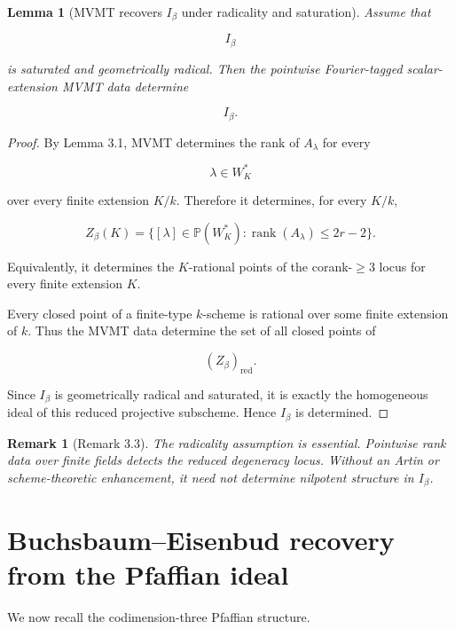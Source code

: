 \documentclass[11pt]{article}
\newtheorem{lemma}[theorem]{Lemma}
\newtheorem{remark}[theorem]{Remark}
\begin{document}
\begin{lemma}[MVMT recovers $I_\beta$ under radicality and saturation]

Assume that

\[
I_\beta
\]

is saturated and geometrically radical. Then the pointwise Fourier-tagged scalar-extension MVMT data determine

\[
I_\beta.
\]

\end{lemma}

\begin{proof}

By Lemma 3.1, MVMT determines the rank of $A_\lambda$ for every

\[
\lambda\in W_K^*
\]

over every finite extension $K/k$. Therefore it determines, for every $K/k$,

\[
Z_\beta(K)
=
\{[\lambda]\in\mathbb P(W_K^*):\operatorname{rank}(A_\lambda)\le2r-2\}.
\]

Equivalently, it determines the $K$-rational points of the corank-$\ge3$ locus for every finite extension $K$.

Every closed point of a finite-type $k$-scheme is rational over some finite extension of $k$. Thus the MVMT data determine the set of all closed points of

\[
(Z_\beta)_{\mathrm{red}}.
\]

Since $I_\beta$ is geometrically radical and saturated, it is exactly the homogeneous ideal of this reduced projective subscheme. Hence $I_\beta$ is determined.

\end{proof}

\begin{remark}[Remark 3.3]

The radicality assumption is essential. Pointwise rank data over finite fields detects the reduced degeneracy locus. Without an Artin or scheme-theoretic enhancement, it need not determine nilpotent structure in $I_\beta$.

\end{remark}

\section{Buchsbaum--Eisenbud recovery from the Pfaffian ideal}

We now recall the codimension-three Pfaffian structure.
\end{document}
